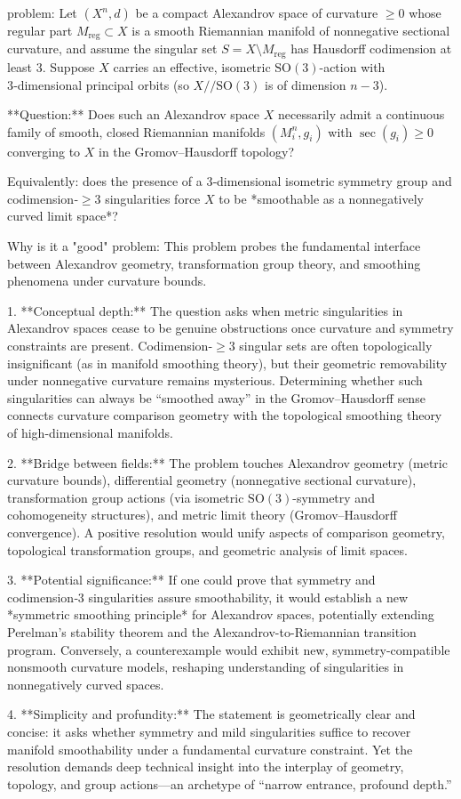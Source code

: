problem:  
Let \( (X^n, d) \) be a compact Alexandrov space of curvature \(\ge 0\) whose regular part \( M_{\mathrm{reg}} \subset X\) is a smooth Riemannian manifold of nonnegative sectional curvature, and assume the singular set \(S = X \setminus M_{\mathrm{reg}}\) has Hausdorff codimension at least \(3\). Suppose \(X\) carries an effective, isometric \(\mathrm{SO}(3)\)-action with 3‑dimensional principal orbits (so \(X/\!\!/\mathrm{SO}(3)\) is of dimension \(n-3\)).  

**Question:**  
Does such an Alexandrov space \(X\) necessarily admit a continuous family of smooth, closed Riemannian manifolds \( (M_i^n, g_i)\) with \(\sec(g_i)\ge 0\) converging to \(X\) in the Gromov–Hausdorff topology?  

Equivalently: does the presence of a 3‑dimensional isometric symmetry group and codimension‑\(\ge 3\) singularities force \(X\) to be *smoothable as a nonnegatively curved limit space*?

Why is it a "good" problem:  
This problem probes the fundamental interface between Alexandrov geometry, transformation group theory, and smoothing phenomena under curvature bounds.  

1. **Conceptual depth:**  
   The question asks when metric singularities in Alexandrov spaces cease to be genuine obstructions once curvature and symmetry constraints are present. Codimension‑\(\ge3\) singular sets are often topologically insignificant (as in manifold smoothing theory), but their geometric removability under nonnegative curvature remains mysterious. Determining whether such singularities can always be “smoothed away” in the Gromov–Hausdorff sense connects curvature comparison geometry with the topological smoothing theory of high-dimensional manifolds.

2. **Bridge between fields:**  
   The problem touches Alexandrov geometry (metric curvature bounds), differential geometry (nonnegative sectional curvature), transformation group actions (via isometric \(\mathrm{SO}(3)\)-symmetry and cohomogeneity structures), and metric limit theory (Gromov–Hausdorff convergence). A positive resolution would unify aspects of comparison geometry, topological transformation groups, and geometric analysis of limit spaces.

3. **Potential significance:**  
   If one could prove that symmetry and codimension‑3 singularities assure smoothability, it would establish a new *symmetric smoothing principle* for Alexandrov spaces, potentially extending Perelman’s stability theorem and the Alexandrov-to-Riemannian transition program. Conversely, a counterexample would exhibit new, symmetry-compatible nonsmooth curvature models, reshaping understanding of singularities in nonnegatively curved spaces.

4. **Simplicity and profundity:**  
   The statement is geometrically clear and concise: it asks whether symmetry and mild singularities suffice to recover manifold smoothability under a fundamental curvature constraint. Yet the resolution demands deep technical insight into the interplay of geometry, topology, and group actions—an archetype of “narrow entrance, profound depth.”